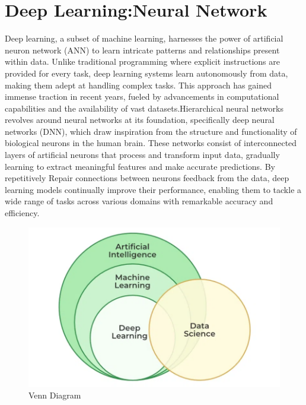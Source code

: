 \section{Deep Learning:Neural Network}
Deep learning, a subset of machine learning, harnesses the power of artificial neuron network (ANN) to learn intricate patterns and relationships present within data. Unlike traditional programming where explicit instructions are provided for every task, deep learning systems learn autonomously from data, making them adept at handling complex tasks. This approach has gained immense traction in recent years, fueled by advancements in computational capabilities and the availability of vast datasets.Hierarchical neural networks revolves around neural networks at its foundation, specifically deep neural networks (DNN), which draw inspiration from the structure and functionality of biological neurons in the human brain. These networks consist of interconnected layers of artificial neurons that process and transform input data, gradually learning to extract meaningful features and make accurate predictions. By repetitively Repair connections between neurons feedback from the data, deep learning models continually improve their performance, enabling them to tackle a wide range of tasks across various domains with remarkable accuracy and efficiency.
\\
 \begin{figure}[hbt!]
  \centering
 \includegraphics[width=0.8\linewidth]{C_chap/fig27.png}
     \caption{ Venn Diagram }
\end{figure}
\\
